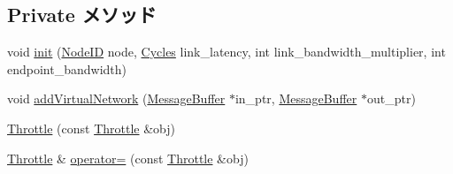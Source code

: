 \subsection*{Private メソッド}
\begin{DoxyCompactItemize}
\item 
void \hyperlink{classThrottle_a31eb3e3a30bb1a2df265a2caf387063f}{init} (\hyperlink{TypeDefines_8hh_a83c14b4ae37e80071f6b3506a6c46151}{NodeID} node, \hyperlink{classCycles}{Cycles} link\_\-latency, int link\_\-bandwidth\_\-multiplier, int endpoint\_\-bandwidth)
\item 
void \hyperlink{classThrottle_a799e1642559b1e43258f49eca0a6653c}{addVirtualNetwork} (\hyperlink{classMessageBuffer}{MessageBuffer} $\ast$in\_\-ptr, \hyperlink{classMessageBuffer}{MessageBuffer} $\ast$out\_\-ptr)
\item 
\hyperlink{classThrottle_a834d68752709e4d48a36c4677edc7bc4}{Throttle} (const \hyperlink{classThrottle}{Throttle} \&obj)
\item 
\hyperlink{classThrottle}{Throttle} \& \hyperlink{classThrottle_af0867726cb5ec1e81b561e036269ee7b}{operator=} (const \hyperlink{classThrottle}{Throttle} \&obj)
\end{DoxyCompactItemize}
